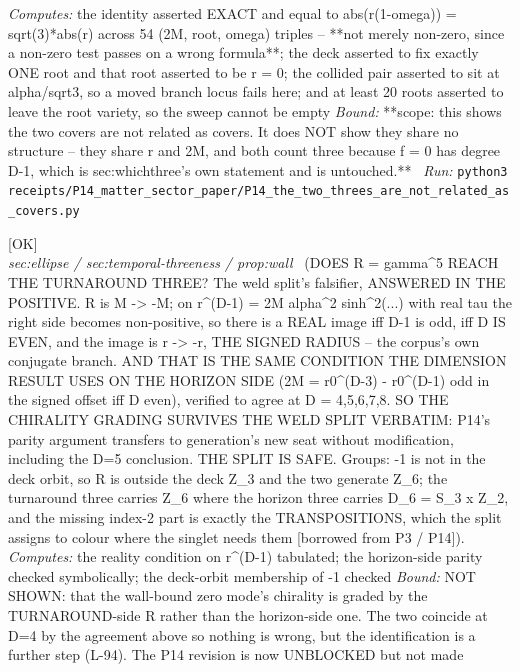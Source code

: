 \begin{description}
\emph{Computes:} the identity asserted EXACT and equal to abs(r(1-omega)) = sqrt(3)*abs(r) across 54 (2M, root, omega) triples -- **not merely non-zero, since a non-zero test passes on a wrong formula**; the deck asserted to fix exactly ONE root and that root asserted to be r = 0; the collided pair asserted to sit at alpha/sqrt3, so a moved branch locus fails here; and at least 20 roots asserted to leave the root variety, so the sweep cannot be empty
 \emph{Bound:} **scope: this shows the two covers are not related as covers. It does NOT show they share no structure -- they share r and 2M, and both count three because f = 0 has degree D-1, which is sec:whichthree's own statement and is untouched.**
\ \emph{Run:} \texttt{python3 receipts/P14\_matter\_sector\_paper/P14\_the\_two\_threes\_are\_not\_related\_as\_covers.py}
\item[\rcptlabel{P03_R_reaches_the_turnaround}{P3R36}\textbf{P3R36}\quad\texttt{P03\_R\_reaches\_the\_turnaround}]\hfill\textsf{[OK]}\\
\textit{sec:ellipse / sec:temporal-threeness / prop:wall} \ (DOES R = gamma\textasciicircum{}5 REACH THE TURNAROUND THREE? The weld split's falsifier, ANSWERED IN THE POSITIVE. R is M -> -M; on r\textasciicircum{}(D-1) = 2M alpha\textasciicircum{}2 sinh\textasciicircum{}2(...) with real tau the right side becomes non-positive, so there is a REAL image iff D-1 is odd, iff D IS EVEN, and the image is r -> -r, THE SIGNED RADIUS -- the corpus's own conjugate branch. AND THAT IS THE SAME CONDITION THE DIMENSION RESULT USES ON THE HORIZON SIDE (2M = r0\textasciicircum{}(D-3) - r0\textasciicircum{}(D-1) odd in the signed offset iff D even), verified to agree at D = 4,5,6,7,8. SO THE CHIRALITY GRADING SURVIVES THE WELD SPLIT VERBATIM: P14's parity argument transfers to generation's new seat without modification, including the D=5 conclusion. THE SPLIT IS SAFE. Groups: -1 is not in the deck orbit, so R is outside the deck Z\_3 and the two generate Z\_6; the turnaround three carries Z\_6 where the horizon three carries D\_6 = S\_3 x Z\_2, and the missing index-2 part is exactly the TRANSPOSITIONS, which the split assigns to colour where the singlet needs them [borrowed from P3 / P14]). 
\emph{Computes:} the reality condition on r\textasciicircum{}(D-1) tabulated; the horizon-side parity checked symbolically; the deck-orbit membership of -1 checked
 \emph{Bound:} NOT SHOWN: that the wall-bound zero mode's chirality is graded by the TURNAROUND-side R rather than the horizon-side one. The two coincide at D=4 by the agreement above so nothing is wrong, but the identification is a further step (L-94). The P14 revision is now UNBLOCKED but not made

\end{description}
